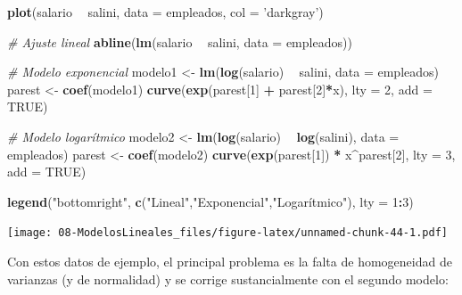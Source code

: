 \documentclass[]{book}
\newenvironment{Shaded}{\begin{snugshade}}{\end{snugshade}}
\newcommand{\KeywordTok}[1]{\textcolor[rgb]{0.13,0.29,0.53}{\textbf{#1}}}
\newcommand{\DataTypeTok}[1]{\textcolor[rgb]{0.13,0.29,0.53}{#1}}
\newcommand{\DecValTok}[1]{\textcolor[rgb]{0.00,0.00,0.81}{#1}}
\newcommand{\StringTok}[1]{\textcolor[rgb]{0.31,0.60,0.02}{#1}}
\newcommand{\CommentTok}[1]{\textcolor[rgb]{0.56,0.35,0.01}{\textit{#1}}}
\newcommand{\OtherTok}[1]{\textcolor[rgb]{0.56,0.35,0.01}{#1}}
\newcommand{\OperatorTok}[1]{\textcolor[rgb]{0.81,0.36,0.00}{\textbf{#1}}}
\newcommand{\NormalTok}[1]{#1}
\begin{document}
\begin{Shaded}
\begin{Highlighting}[]
\KeywordTok{plot}\NormalTok{(salario }\OperatorTok{~}\StringTok{ }\NormalTok{salini, }\DataTypeTok{data =}\NormalTok{ empleados, }\DataTypeTok{col =} \StringTok{'darkgray'}\NormalTok{)}

\CommentTok{# Ajuste lineal}
\KeywordTok{abline}\NormalTok{(}\KeywordTok{lm}\NormalTok{(salario }\OperatorTok{~}\StringTok{ }\NormalTok{salini, }\DataTypeTok{data =}\NormalTok{ empleados)) }

\CommentTok{# Modelo exponencial}
\NormalTok{modelo1 <-}\StringTok{ }\KeywordTok{lm}\NormalTok{(}\KeywordTok{log}\NormalTok{(salario) }\OperatorTok{~}\StringTok{ }\NormalTok{salini, }\DataTypeTok{data =}\NormalTok{ empleados)}
\NormalTok{parest <-}\StringTok{ }\KeywordTok{coef}\NormalTok{(modelo1)}
\KeywordTok{curve}\NormalTok{(}\KeywordTok{exp}\NormalTok{(parest[}\DecValTok{1}\NormalTok{] }\OperatorTok{+}\StringTok{ }\NormalTok{parest[}\DecValTok{2}\NormalTok{]}\OperatorTok{*}\NormalTok{x), }\DataTypeTok{lty =} \DecValTok{2}\NormalTok{, }\DataTypeTok{add =} \OtherTok{TRUE}\NormalTok{)}

\CommentTok{# Modelo logarítmico}
\NormalTok{modelo2 <-}\StringTok{ }\KeywordTok{lm}\NormalTok{(}\KeywordTok{log}\NormalTok{(salario) }\OperatorTok{~}\StringTok{ }\KeywordTok{log}\NormalTok{(salini), }\DataTypeTok{data =}\NormalTok{ empleados)}
\NormalTok{parest <-}\StringTok{ }\KeywordTok{coef}\NormalTok{(modelo2)}
\KeywordTok{curve}\NormalTok{(}\KeywordTok{exp}\NormalTok{(parest[}\DecValTok{1}\NormalTok{]) }\OperatorTok{*}\StringTok{ }\NormalTok{x}\OperatorTok{^}\NormalTok{parest[}\DecValTok{2}\NormalTok{], }\DataTypeTok{lty =} \DecValTok{3}\NormalTok{, }\DataTypeTok{add =} \OtherTok{TRUE}\NormalTok{)}

\KeywordTok{legend}\NormalTok{(}\StringTok{"bottomright"}\NormalTok{, }\KeywordTok{c}\NormalTok{(}\StringTok{"Lineal"}\NormalTok{,}\StringTok{"Exponencial"}\NormalTok{,}\StringTok{"Logarítmico"}\NormalTok{), }\DataTypeTok{lty =} \DecValTok{1}\OperatorTok{:}\DecValTok{3}\NormalTok{)}
\end{Highlighting}
\end{Shaded}

\texttt{[image: 08-ModelosLineales\_files/figure-latex/unnamed-chunk-44-1.pdf]}

Con estos datos de ejemplo, el principal problema es la falta de
homogeneidad de varianzas (y de normalidad) y se corrige sustancialmente
con el segundo modelo:
\end{document}
